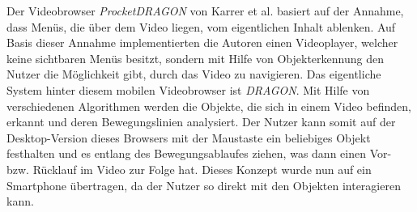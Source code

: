 \documentclass[11pt,a4paper]{report}
\begin{document}
Der Videobrowser \emph{ProcketDRAGON} von Karrer et al. \cite{karrer2009pocketdragon} basiert auf der Annahme, dass Menüs, die über dem Video liegen, vom eigentlichen Inhalt ablenken. Auf Basis dieser Annahme implementierten die Autoren einen Videoplayer, welcher keine sichtbaren Menüs besitzt, sondern mit Hilfe von Objekterkennung den Nutzer die Möglichkeit gibt, durch das Video zu navigieren. Das eigentliche System hinter diesem mobilen Videobrowser ist \emph{DRAGON}. Mit Hilfe von verschiedenen Algorithmen werden die Objekte, die sich in einem Video befinden, erkannt und deren Bewegungslinien analysiert. Der Nutzer kann somit auf der Desktop-Version dieses Browsers mit der Maustaste ein beliebiges Objekt festhalten und es entlang des Bewegungsablaufes ziehen, was dann einen Vor- bzw. Rücklauf im Video zur Folge hat. Dieses Konzept wurde nun auf ein Smartphone übertragen, da der Nutzer so direkt mit den Objekten interagieren kann.
\end{document}
